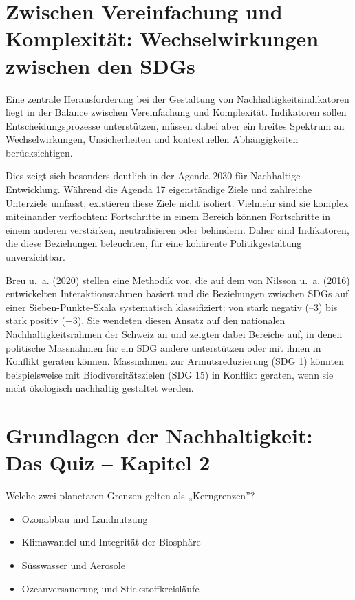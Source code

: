 \documentclass[
  nswissgerman,
  a4paper,
  openany]{book}
\providecommand{\tightlist}{%
  \setlength{\itemsep}{0pt}\setlength{\parskip}{0pt}}
\begin{document}
\section{Zwischen Vereinfachung und Komplexität: Wechselwirkungen
zwischen den
SDGs}\label{zwischen-vereinfachung-und-komplexituxe4t-wechselwirkungen-zwischen-den-sdgs}

Eine zentrale Herausforderung bei der Gestaltung von
Nachhaltigkeitsindikatoren liegt in der Balance zwischen Vereinfachung
und Komplexität. Indikatoren sollen Entscheidungsprozesse unterstützen,
müssen dabei aber ein breites Spektrum an Wechselwirkungen,
Unsicherheiten und kontextuellen Abhängigkeiten berücksichtigen.

Dies zeigt sich besonders deutlich in der Agenda 2030 für Nachhaltige
Entwicklung. Während die Agenda 17 eigenständige Ziele und zahlreiche
Unterziele umfasst, existieren diese Ziele nicht isoliert. Vielmehr sind
sie komplex miteinander verflochten: Fortschritte in einem Bereich
können Fortschritte in einem anderen verstärken, neutralisieren oder
behindern. Daher sind Indikatoren, die diese Beziehungen beleuchten, für
eine kohärente Politikgestaltung unverzichtbar.

Breu u.~a. (2020) stellen eine Methodik vor, die auf dem von Nilsson
u.~a. (2016) entwickelten Interaktionsrahmen basiert und die Beziehungen
zwischen SDGs auf einer Sieben-Punkte-Skala systematisch klassifiziert:
von stark negativ (--3) bis stark positiv (+3). Sie wendeten diesen
Ansatz auf den nationalen Nachhaltigkeitsrahmen der Schweiz an und
zeigten dabei Bereiche auf, in denen politische Massnahmen für ein SDG
andere unterstützen oder mit ihnen in Konflikt geraten können.
Massnahmen zur Armutsreduzierung (SDG 1) könnten beispielsweise mit
Biodiversitätszielen (SDG 15) in Konflikt geraten, wenn sie nicht
ökologisch nachhaltig gestaltet werden.

\section{Grundlagen der Nachhaltigkeit: Das Quiz -- Kapitel
2}\label{grundlagen-der-nachhaltigkeit-das-quiz-kapitel-2}

Welche zwei planetaren Grenzen gelten als „Kerngrenzen''?

\begin{itemize}
\tightlist
\item[$\square$]
  Ozonabbau und Landnutzung
\item[$\square$]
  Klimawandel und Integrität der Biosphäre
\item[$\square$]
  Süsswasser und Aerosole
\item[$\square$]
  Ozeanversauerung und Stickstoffkreisläufe
\end{itemize}
\end{document}
